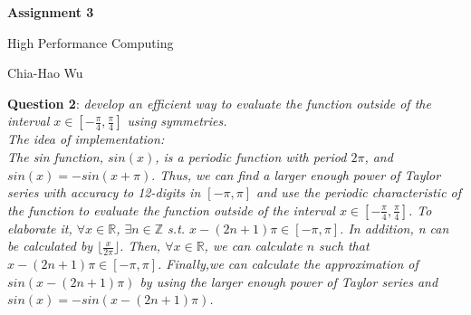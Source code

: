 \documentclass[12pt]{article} %
\newcommand{\question}[2][]{\begin{flushleft}
        \textbf{Question #1}: \textit{#2}

\end{flushleft}}
\newcommand{\maketitletwo}[2][]{\begin{center}
        \Large{\textbf{Assignment #1}
        
        High Performance Computing} %
        \vspace{5pt}
        
        \normalsize{Chia-Hao Wu  %
        
        #2}        %
        \vspace{15pt}
        
\end{center}}
\begin{document}
    \maketitletwo[3]{}  %
    
    \question[2]{
      develop an efficient way to evaluate the function outside of the interval $x \in [-\frac{\pi}{4}, \frac{\pi}{4}]$ using symmetries.\vspace{10pt}\\
      \normalsize{The idea of implementation:}\vspace{5pt}\\
      The sin function, $sin(x)$, is a periodic function with period $2\pi$, and $sin(x) = -sin(x + \pi).$ Thus, we can find a larger enough power of Taylor series with accuracy to 12-digits in $[-\pi, \pi]$ and use the periodic characteristic of the function to evaluate the function outside of the interval $x \in [-\frac{\pi}{4}, \frac{\pi}{4}]$. To elaborate it, $\forall x \in \mathbb{R}$, $\exists n \in \mathbb{Z}$ s.t. $x - (2n + 1)\pi \in [-\pi, \pi]$. In addition, n can be calculated by $\lfloor\frac{x}{2\pi}\rfloor$. Then, $\forall x \in \mathbb{R}$, we can calculate $n$ such that $x - (2n + 1)\pi \in [-\pi, \pi]$. Finally,we can calculate the approximation of $sin(x - (2n + 1)\pi)$ by using the larger enough power of Taylor series and  $sin(x) = -sin(x - (2n + 1)\pi)$.
    }
    
\end{document}
